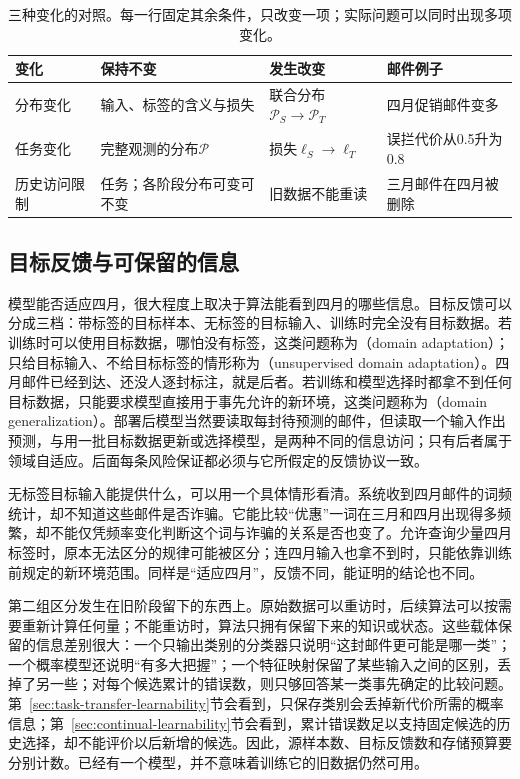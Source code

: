 \begin{table}[htbp]
 \centering
 \caption{三种变化的对照。每一行固定其余条件，只改变一项；实际问题可以同时出现多项变化。}
 \label{tab:transfer-three-changes}
 \begin{tabularx}{\linewidth}{@{}l>{\raggedright\arraybackslash}X>{\raggedright\arraybackslash}X>{\raggedright\arraybackslash}X@{}}
  \toprule
  变化 & 保持不变 & 发生改变 & 邮件例子 \\
  \midrule
  分布变化 & 输入、标签的含义与损失 & 联合分布$\mathcal P_S\to\mathcal P_T$ & 四月促销邮件变多 \\
  任务变化 & 完整观测的分布$\mathcal P$ & 损失$\ell_S\to\ell_T$ & 误拦代价从0.5升为0.8 \\
  历史访问限制 & 任务；各阶段分布可变可不变 & 旧数据不能重读 & 三月邮件在四月被删除 \\
  \bottomrule
 \end{tabularx}
\end{table}

\subsection{目标反馈与可保留的信息}
\label{sec:transfer-feedback-information}

模型能否适应四月，很大程度上取决于算法能看到四月的哪些信息。目标反馈可以分成三档：带标签的目标样本、无标签的目标输入、训练时完全没有目标数据。若训练时可以使用目标数据，哪怕没有标签，这类问题称为（domain adaptation）；只给目标输入、不给目标标签的情形称为（unsupervised domain adaptation）。四月邮件已经到达、还没人逐封标注，就是后者。若训练和模型选择时都拿不到任何目标数据，只能要求模型直接用于事先允许的新环境，这类问题称为（domain generalization）。部署后模型当然要读取每封待预测的邮件，但读取一个输入作出预测，与用一批目标数据更新或选择模型，是两种不同的信息访问；只有后者属于领域自适应。后面每条风险保证都必须与它所假定的反馈协议一致。

无标签目标输入能提供什么，可以用一个具体情形看清。系统收到四月邮件的词频统计，却不知道这些邮件是否诈骗。它能比较“优惠”一词在三月和四月出现得多频繁，却不能仅凭频率变化判断这个词与诈骗的关系是否也变了。允许查询少量四月标签时，原本无法区分的规律可能被区分；连四月输入也拿不到时，只能依靠训练前规定的新环境范围。同样是“适应四月”，反馈不同，能证明的结论也不同。

第二组区分发生在旧阶段留下的东西上。原始数据可以重访时，后续算法可以按需要重新计算任何量；不能重访时，算法只拥有保留下来的知识或状态。这些载体保留的信息差别很大：一个只输出类别的分类器只说明“这封邮件更可能是哪一类”；一个概率模型还说明“有多大把握”；一个特征映射保留了某些输入之间的区别，丢掉了另一些；对每个候选累计的错误数，则只够回答某一类事先确定的比较问题。第~\ref{sec:task-transfer-learnability}节会看到，只保存类别会丢掉新代价所需的概率信息；第~\ref{sec:continual-learnability}节会看到，累计错误数足以支持固定候选的历史选择，却不能评价以后新增的候选。因此，源样本数、目标反馈数和存储预算要分别计数。已经有一个模型，并不意味着训练它的旧数据仍然可用。

